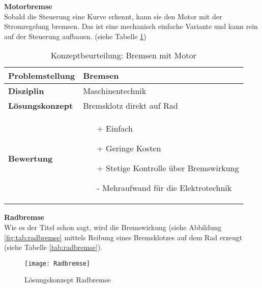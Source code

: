 \documentclass[../../main.tex]{subfiles}
\begin{document}
    \textbf{Motorbremse}\\
    Sobald die Steuerung eine Kurve erkennt, kann sie den Motor mit der Stromregelung bremsen. Das ist eine mechanisch einfache Variante und kann rein auf der Steuerung aufbauen. (siehe Tabelle \ref{tab:motorbremse})

    \begin{flushleft}
        \begin{table}[h]
        \begin{tabular}{ | l | p{11cm} |}
        \hline
        \textbf{Problemstellung} & Bremsen \\ \hline
        \textbf{Disziplin} & Maschinentechnik \\ \hline
        \textbf{Lösungskonzept} & Bremsklotz direkt auf Rad \\ \hline
        \textbf{Bewertung} &  \begin{itemize}
                                \item[+] Einfach
                                \item[+] Geringe Kosten
                                \item[+] Stetige Kontrolle über Bremswirkung 
                                \item[-] Mehraufwand für die Elektrotechnik 
                              \end{itemize} \\ \hline
        \end{tabular}
        \caption{Konzeptbeurteilung: Bremsen mit Motor}
        \label{tab:motorbremse}
    \end{table}
    \end{flushleft}

    \textbf{Radbremse}\\
    Wie es der Titel schon sagt, wird die Bremswirkung (siehe Abbildung \ref{fig:tab:radbremse} mittels Reibung eines Bremsklotzes auf dem Rad erzeugt (siehe Tabelle \ref{tab:radbremse}).

    \begin{figure}[H] %
        \centering
        \texttt{[image: Radbremse]}
        \caption{Lösungskonzept Radbremse}
        \label{fig:radbremse}
    \end{figure}
\end{document}
